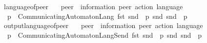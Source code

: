 \begin{isabellebody}
\isanewline
{}\isamarkupfalse%
\ language{\isacharunderscore}{\kern0pt}of{\isacharunderscore}{\kern0pt}peer\isanewline
\ \ {\isacharcolon}{\kern0pt}{\isacharcolon}{\kern0pt}\ {\isachardoublequoteopen}{\isacharprime}{\kern0pt}peer\ {\isasymRightarrow}\ {\isacharparenleft}{\kern0pt}{\isacharprime}{\kern0pt}information{\isacharcomma}{\kern0pt}\ {\isacharprime}{\kern0pt}peer{\isacharparenright}{\kern0pt}\ action\ language{\isachardoublequoteclose}\ \ {\isacharparenleft}{\kern0pt}{\isachardoublequoteopen}{\isasymL}\ {\isacharunderscore}{\kern0pt}{\isachardoublequoteclose}\ {\isacharbrackleft}{\kern0pt}{}{}{\isacharbrackright}{\kern0pt}\ {}{}{}{\isacharparenright}{\kern0pt}\ \isanewline
\ \ {\isachardoublequoteopen}{\isasymL}{\isacharparenleft}{\kern0pt}p{\isacharparenright}{\kern0pt}\ {\isasymequiv}\ CommunicatingAutomaton{\isachardot}{\kern0pt}Lang\ {\isacharparenleft}{\kern0pt}fst\ {\isacharparenleft}{\kern0pt}snd\ {\isacharparenleft}{\kern0pt}{\isasymA}\ p{\isacharparenright}{\kern0pt}{\isacharparenright}{\kern0pt}{\isacharparenright}{\kern0pt}\ {\isacharparenleft}{\kern0pt}snd\ {\isacharparenleft}{\kern0pt}snd\ {\isacharparenleft}{\kern0pt}{\isasymA}\ p{\isacharparenright}{\kern0pt}{\isacharparenright}{\kern0pt}{\isacharparenright}{\kern0pt}{\isachardoublequoteclose}\isanewline
\isanewline
{}\isamarkupfalse%
\ output{\isacharunderscore}{\kern0pt}language{\isacharunderscore}{\kern0pt}of{\isacharunderscore}{\kern0pt}peer\isanewline
\ \ {\isacharcolon}{\kern0pt}{\isacharcolon}{\kern0pt}\ {\isachardoublequoteopen}{\isacharprime}{\kern0pt}peer\ {\isasymRightarrow}\ {\isacharparenleft}{\kern0pt}{\isacharprime}{\kern0pt}information{\isacharcomma}{\kern0pt}\ {\isacharprime}{\kern0pt}peer{\isacharparenright}{\kern0pt}\ action\ language{\isachardoublequoteclose}\ \ {\isacharparenleft}{\kern0pt}{\isachardoublequoteopen}{\isasymL}\isactrlsub {\isacharbang}{\kern0pt}\ {\isacharunderscore}{\kern0pt}{\isachardoublequoteclose}\ {\isacharbrackleft}{\kern0pt}{}{}{\isacharbrackright}{\kern0pt}\ {}{}{}{\isacharparenright}{\kern0pt}\ \isanewline
\ \ {\isachardoublequoteopen}{\isasymL}\isactrlsub {\isacharbang}{\kern0pt}{\isacharparenleft}{\kern0pt}p{\isacharparenright}{\kern0pt}\ {\isasymequiv}\ CommunicatingAutomaton{\isachardot}{\kern0pt}LangSend\ {\isacharparenleft}{\kern0pt}fst\ {\isacharparenleft}{\kern0pt}snd\ {\isacharparenleft}{\kern0pt}{\isasymA}\ p{\isacharparenright}{\kern0pt}{\isacharparenright}{\kern0pt}{\isacharparenright}{\kern0pt}\ {\isacharparenleft}{\kern0pt}snd\ {\isacharparenleft}{\kern0pt}snd\ {\isacharparenleft}{\kern0pt}{\isasymA}\ p{\isacharparenright}{\kern0pt}{\isacharparenright}{\kern0pt}{\isacharparenright}{\kern0pt}{\isachardoublequoteclose}\isanewline

\end{isabellebody}
